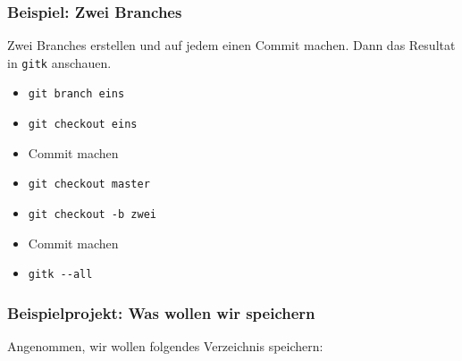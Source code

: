 \documentclass{beamer}
\begin{document}
\begin{frame}
 \frametitle{Beispiel: Zwei Branches}



Zwei Branches erstellen und auf jedem einen Commit machen. Dann das
Resultat in \texttt{gitk} anschauen.

\begin{itemize}
	\item \texttt{git branch eins}
	\item \texttt{git checkout eins}
	\item Commit machen
	\item \texttt{git checkout master}
	\item \texttt{git checkout -b zwei}
	\item Commit machen
	\item \texttt{gitk -{}-all}
\end{itemize}


 \end{frame}
\begin{frame}
 \frametitle{Beispielprojekt: Was wollen wir speichern}



Angenommen, wir wollen folgendes Verzeichnis speichern:


\vspace{0.5cm}




 \end{frame}
\end{document}
